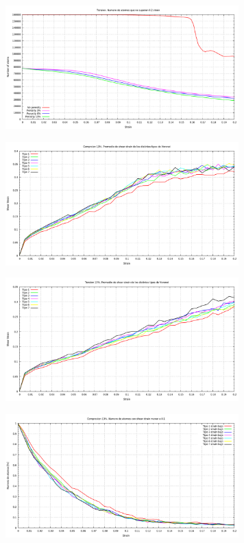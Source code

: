 \documentclass[10pt, oneside]{article} %
\begin{document}
\begin{figure}[H]
\centering
\includegraphics[width=9cm]{Figures/Porosidad/Porosidad_ss_6.png}
\caption{}
\end{figure}

\begin{figure}[H]
\centering
\includegraphics[width=9cm]{Figures/Porosidad/Porosidad_ss_7.png}
\caption{}
\end{figure}

\begin{figure}[H]
\centering
\includegraphics[width=9cm]{Figures/Porosidad/Porosidad_ss_8.png}
\caption{}
\end{figure}

\begin{figure}[H]
\centering
\includegraphics[width=9cm]{Figures/Porosidad/Porosidad_ss_9.png}
\caption{}
\end{figure}
\end{document}

